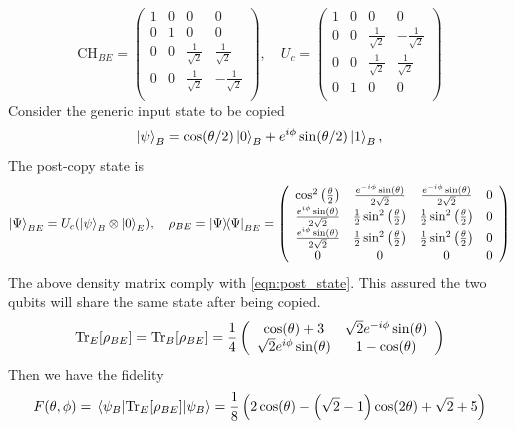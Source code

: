 \[
\text{CH}_{BE}=\left(
    \begin{array}{cccc}
     1 & 0 & 0 & 0 \\
     0 & 1 & 0 & 0 \\
     0 & 0 & \frac{1}{\sqrt{2}} & \frac{1}{\sqrt{2}} \\
     0 & 0 & \frac{1}{\sqrt{2}} & -\frac{1}{\sqrt{2}} \\
    \end{array}
    \right), \quad
    U_c=
    \left(
\begin{array}{cccc}
 1 & 0 & 0 & 0 \\
 0 & 0 & \frac{1}{\sqrt{2}} & -\frac{1}{\sqrt{2}} \\
 0 & 0 & \frac{1}{\sqrt{2}} & \frac{1}{\sqrt{2}} \\
 0 & 1 & 0 & 0 \\
\end{array}
\right)
\]
Consider the generic input state to be copied
\[
    \ket{\psi}_B=\cos(\theta/2)\ket{0}_B+e^{i\phi}\sin(\theta/2)\ket{1}_B,
\]
The post-copy state is 
\[
    \ket{\Psi}_{BE}=U_c(\ket{\psi}_B\otimes \ket{0}_E), \quad \rho_{BE}=\ketbra{\Psi}_{BE}=
    \left(
\begin{array}{cccc}
 \cos ^2\left(\frac{\theta }{2}\right) & \frac{e^{-i \phi } \sin (\theta )}{2 \sqrt{2}} & \frac{e^{-i \phi } \sin (\theta )}{2 \sqrt{2}} & 0 \\
 \frac{e^{i \phi } \sin (\theta )}{2 \sqrt{2}} & \frac{1}{2} \sin ^2\left(\frac{\theta }{2}\right) & \frac{1}{2} \sin ^2\left(\frac{\theta }{2}\right) & 0 \\
 \frac{e^{i \phi } \sin (\theta )}{2 \sqrt{2}} & \frac{1}{2} \sin ^2\left(\frac{\theta }{2}\right) & \frac{1}{2} \sin ^2\left(\frac{\theta }{2}\right) & 0 \\
 0 & 0 & 0 & 0 \\
\end{array}
\right)
\]
The above density matrix comply with \ref{eqn:post_state}. This assured the two qubits will share the same state after being copied.
\[
    \Tr_E[\rho_{BE}]=\Tr_B[\rho_{BE}]=\frac{1}{4}\left(
        \begin{array}{cc}
         \cos (\theta )+3 & \sqrt{2} e^{-i \phi } \sin (\theta ) \\
         \sqrt{2} e^{i \phi } \sin (\theta ) & 1-\cos (\theta ) \\
        \end{array}
        \right)
\]
Then we have the fidelity 
\[
F(\theta,\phi)=\expval{\Tr_E[\rho_{BE}]}{\psi_B}=\frac{1}{8} \left(2 \cos (\theta )-\left(\sqrt{2}-1\right) \cos (2 \theta )+\sqrt{2}+5\right)
\]
